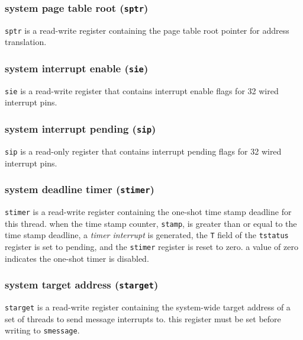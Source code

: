 \subsubsection{system page table root (\texttt{sptr})}
\texttt{sptr} is a read-write register containing the page table root
pointer for address translation.
\\

\subsubsection{system interrupt enable (\texttt{sie})}
\texttt{sie} is a read-write register that contains interrupt enable flags
for 32 wired interrupt pins.
\\

\subsubsection{system interrupt pending (\texttt{sip})}
\texttt{sip} is a read-only register that contains interrupt pending flags
for 32 wired interrupt pins.
\\

\subsubsection{system deadline timer (\texttt{stimer})}
\texttt{stimer} is a read-write register containing the one-shot time stamp
deadline for this thread. when the time stamp counter, \texttt{stamp}, is
greater than or equal to the time stamp deadline, a \emph{timer interrupt}
is generated, the \texttt{T} field of the \texttt{tstatus} register is set
to pending, and the \texttt{stimer} register is reset to zero. a value of
zero indicates the one-shot timer is disabled.
\\

\newpage
\subsubsection{system target address (\texttt{starget})}
\texttt{starget} is a read-write register containing the system-wide
target address of a set of threads to send message interrupts to.
this register must be set before writing to \texttt{smessage}.

